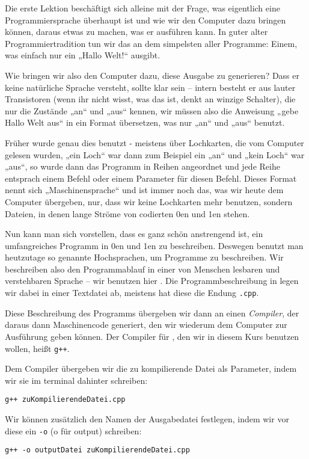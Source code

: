 
Die erste Lektion beschäftigt sich alleine mit der Frage, was eigentlich eine
Programmiersprache überhaupt ist und wie wir den Computer dazu bringen können,
daraus etwas zu machen, was er ausführen kann.  In guter alter
Programmiertradition tun wir das an dem simpelsten aller Programme: Einem, was
einfach nur ein „Hallo Welt!“ ausgibt.

Wie bringen wir also den Computer dazu, diese Ausgabe zu generieren? Dass er
keine natürliche Sprache versteht, sollte klar sein -- intern besteht er aus
lauter Transistoren (wenn ihr nicht wisst, was das ist, denkt an winzige
Schalter), die nur die Zustände „an“ und „aus“ kennen, wir müssen also die
Anweisung „gebe Hallo Welt aus“ in ein Format übersetzen, was nur „an“ und
„aus“ benutzt.

Früher wurde genau dies benutzt - meistens über Lochkarten, die vom Computer
gelesen wurden, „ein Loch“ war dann zum Beispiel ein „an“ und „kein Loch“ war
„aus“, so wurde dann das Programm in Reihen angeordnet und jede Reihe entsprach
einem Befehl oder einem Parameter für diesen Befehl.  Dieses Format nennt sich
„Maschinensprache“ und ist immer noch das, was wir heute dem Computer
übergeben, nur, dass wir keine Lochkarten mehr benutzen, sondern Dateien, in
denen lange Ströme von codierten 0en und 1en stehen.

Nun kann man sich vorstellen, dass es ganz schön anstrengend ist, ein
umfangreiches Programm in 0en und 1en zu beschreiben. Deswegen benutzt man
heutzutage so genannte Hochsprachen, um Programme zu beschreiben. Wir
beschreiben also den Programmablauf in einer von Menschen lesbaren und
verstehbaren Sprache -- wir benutzen hier \Cpp.  Die Programmbeschreibung in
\Cpp legen wir dabei in einer Textdatei ab, meistens hat diese die Endung
\texttt{.cpp}.

Diese Beschreibung des Programms übergeben wir dann an einen \emph{Compiler},
der daraus dann Maschinencode generiert, den wir wiederum dem Computer zur
Ausführung geben können.  Der Compiler für \Cpp, den wir in diesem Kurs
benutzen wollen, heißt \texttt{g++}.

Dem Compiler übergeben wir die zu kompilierende Datei als Parameter, indem wir
sie im \Gls{terminal} dahinter schreiben:
\begin{center}
    \texttt{g++ zuKompilierendeDatei.cpp}
\end{center}
Wir können zusätzlich den Namen der Ausgabedatei festlegen, indem wir vor diese
ein \texttt{-o} (o für output) schreiben:
\begin{center}
    \texttt{g++ -o outputDatei zuKompilierendeDatei.cpp}
\end{center}


